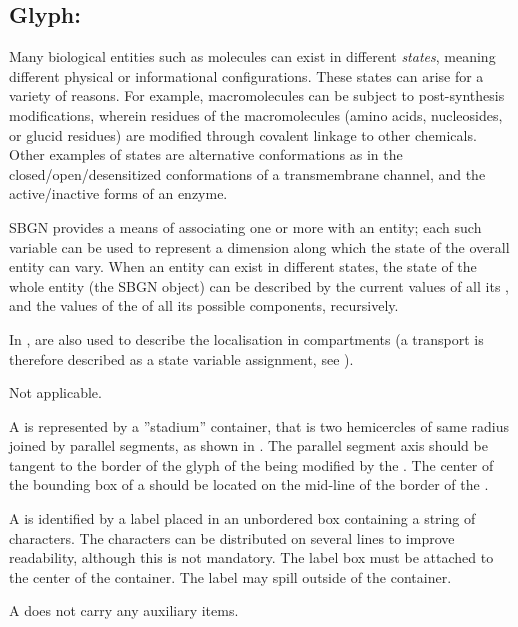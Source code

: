 
\subsection{Glyph: }
\label{sec:stateVariable}

Many biological entities such as molecules can exist in different \emph{states}, meaning different physical or informational configurations.  These states can arise for a variety of reasons.  For example, macromolecules can be subject to post-synthesis modifications, wherein residues of the macromolecules (amino acids, nucleosides, or glucid residues) are modified through covalent linkage to other chemicals.  Other examples of states are alternative conformations as in the closed/open/desensitized conformations of a transmembrane channel, and the active/inactive forms of an enzyme.

SBGN provides a means of associating one or more  with an entity; each such variable can be used to represent a dimension along which the state of the overall entity can vary.  When an entity can exist in different states, the state of the whole entity (\ie the SBGN object) can be described by the current values of all its , and the values of the  of all its possible components, recursively.

In \SBGNERLone,  are also used to describe the localisation in compartments (a transport is therefore described as a state variable assignment, see ).

\begin{glyphDescription}

\glyphSboTerm Not applicable.

\glyphContainer A  is represented by a ''stadium'' container, that is two hemicercles of same radius joined by parallel segments, as shown in .  The parallel segment axis should be tangent to the border of the glyph of the  being modified by the . The center of the bounding box of a  should be located on the mid-line of the border of the .

\glyphLabel A  is identified by a label placed in an unbordered box containing a string of characters.  The characters can be distributed on several lines to improve readability, although this is not mandatory.  The label box must be attached to the center of the container.  The label may spill outside of the container.

\glyphAux A  does not carry any auxiliary items.  

\end{glyphDescription}

